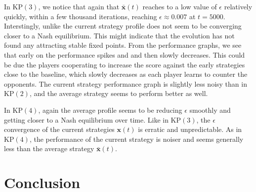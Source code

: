 \documentclass{aamas2014}
\newcommand{\bx}{\mathbf{x}}
\newcommand{\todo}[1]{{\color{red}{\bf #1}}}
\begin{document}
In KP$(3)$, we notice that again that $\bar{\bx}(t)$ reaches to a low value of $\epsilon$ relatively quickly, within 
a few thousand iterations, reaching $\epsilon \approx 0.007$ at $t = 5000$. 
\todo{What about at 100000? Refer to Risk 2010.}
Interstingly, unlike 
the current strategy profile does not seem to be converging closer to a Nash equilibrium. This might indicate that the evolution 
has not found any attracting stable fixed points. From the performance graphs, we see that early on the performance spikes and 
and then slowly decreases. This could be due the players cooperating to increase the score against the early 
strategies close to the baseline, which slowly decreases as each player learns to counter the opponents. The current strategy
performance graph is slightly less noisy than in KP$(2)$, and the average strategy seems to perform better as well. 

In KP$(4)$, again the average profile seems to be reducing $\epsilon$ smoothly and getting closer to a Nash equilibrium 
over time. Like in KP$(3)$, the $\epsilon$ convergence of the current strategies $\bx(t)$ is erratic and unpredictable. 
As in KP$(4)$, the performance of the current strategy is noiser and seems generally less than the average 
strategy $\bar{\bx}(t)$. 

\section{Conclusion}



%

%
%
\end{document}

